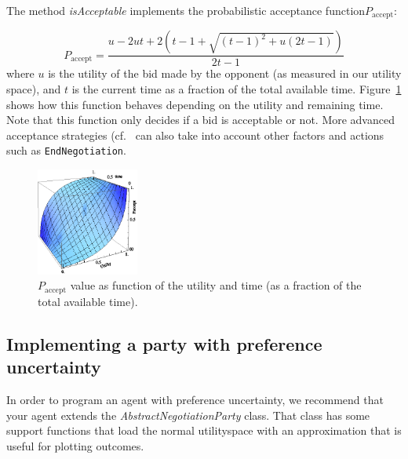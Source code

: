 \documentclass[]{article}
\begin{document}
The method \textit{isAcceptable} implements the probabilistic acceptance function$P_\text{accept}$:

\begin{equation}
	P_\text{accept} = \dfrac{u - 2ut + 2\left(t - 1 + \sqrt{(t - 1)^2 + u(2t - 1)}\right)}{2t - 1}
\end{equation}
where $u$ is the utility of the bid made by the opponent (as measured in our utility space), and $t$ is the current time as a fraction of the total available time. Figure~\ref{Fig:Paccept} shows how this function behaves depending on the utility and remaining time. Note that this function only decides if a bid is acceptable or not. More advanced acceptance strategies (cf.~\cite{Baarslag13AAMAS,Baarslag13DSS,ANAC2010KawExt} can also take into account other factors and actions such as \texttt{EndNegotiation}.

\begin{figure}[htb]
	\centering
	\includegraphics[width=0.3\textwidth]{media/image21.png}
	\caption{$P_\text{accept}$ value as function of the utility and time (as a fraction of the total available time).}\label{Fig:Paccept}
\end{figure}
 




\subsection{Implementing a party with preference uncertainty}
\label{sec:newUncertainAgent}

In order to program an agent with preference uncertainty, we recommend that your agent extends the \textit{AbstractNegotiationParty} class. That class has some support functions that load the normal utilityspace with an approximation that is useful for plotting outcomes. 
\end{document}
